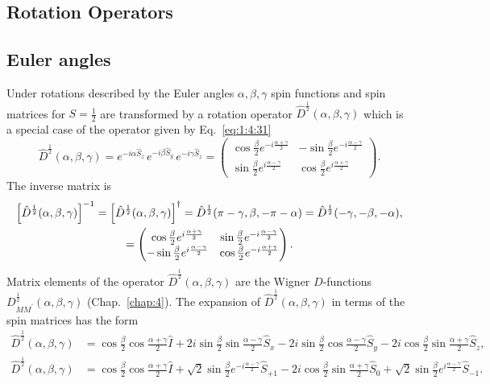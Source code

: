 \subsection{Rotation Operators}
\subsection{Euler angles}
 Under rotations described by the Euler angles $\alpha, \beta, \gamma$ spin functions and spin matrices for $S=\frac{1}{2}$ are transformed by a rotation operator $\widehat{D}^{\frac{1}{2}}(\alpha, \beta, \gamma)$ which is a special case of the operator given by Eq.~\eqref{eq:1:4:31}
\begin{equation}
\hat{D}^{\frac{1}{2}}(\alpha, \beta, \gamma)=e^{-i \alpha \hat{S}_{z}} \, e^{-i \beta \hat{S}_{y}} \, e^{-i \gamma \hat{S}_{z}}=\begin{pmatrix}
\cos \frac{\beta}{2} e^{-i \frac{\alpha+\gamma}{2}} & -\sin \frac{\beta}{2} e^{-i \frac{\alpha-\gamma}{2}}  \label{eq:2:5:32}\\
\sin \frac{\beta}{2} e^{i \frac{\alpha-\gamma}{2}} & \cos \frac{\beta}{2} e^{i \frac{\alpha+\gamma}{2}}
\end{pmatrix}.
\end{equation}
The inverse matrix is
\begin{gather}
{\left[\hat{D}^{\frac{1}{2}}(\alpha, \beta, \gamma)\right]^{-1}=\left[\hat{D}^{\frac{1}{2}}(\alpha, \beta, \gamma)\right]^{\dagger}=\hat{D}^{\frac{1}{2}}(\pi-\gamma, \beta,-\pi-\alpha)=\hat{D}^{\frac{1}{2}}(-\gamma,-\beta,-\alpha)} , \notag\\
=\begin{pmatrix}
\cos \frac{\beta}{2} e^{i \frac{\alpha+\gamma}{2}} & \sin \frac{\beta}{2} e^{-i \frac{\alpha-\gamma}{2}} \\
-\sin \frac{\beta}{2} e^{i \frac{\alpha-\gamma}{2}} & \cos \frac{\beta}{2} e^{-i \frac{\alpha+\gamma}{2}}
\end{pmatrix}. \label{eq:2:5:33}
\end{gather}
Matrix elements of the operator $\hat{D}^{\frac{1}{2}}(\alpha, \beta, \gamma)$ are the Wigner $D$-functions $D_{M M^{\prime}}^{\frac{1}{2}}(\alpha, \beta, \gamma)$ (Chap.~\ref{chap:4}). The expansion of $\widehat{D}^{\frac{1}{2}}(\alpha, \beta, \gamma)$ in terms of the spin matrices has the form
\begin{align}
\widehat{D}^{\frac{1}{2}}(\alpha, \beta, \gamma) & =\cos \frac{\beta}{2} \cos \frac{\alpha+\gamma}{2} \widehat{I}+2 i \sin \frac{\beta}{2} \sin \frac{\alpha-\gamma}{2} \widehat{S}_{x}-2 i \sin \frac{\beta}{2} \cos \frac{\alpha-\gamma}{2} \widehat{S}_{y}-2 i \cos \frac{\beta}{2} \sin \frac{\alpha+\gamma}{2} \widehat{S}_{z},  \label{eq:2:5:34}\\
\widehat{D}^{\frac{1}{2}}(\alpha, \beta, \gamma) & =\cos \frac{\beta}{2} \cos \frac{\alpha+\gamma}{2} \widehat{I}+\sqrt{2} \sin \frac{\beta}{2} e^{-i \frac{\alpha-\gamma}{2}} \widehat{S}_{+1}-2 i \cos \frac{\beta}{2} \sin \frac{\alpha+\gamma}{2} \widehat{S}_{0}+\sqrt{2} \sin \frac{\beta}{2} e^{i \frac{\alpha-\gamma}{2}} \widehat{S}_{-1} . \label{eq:2:5:35}
\end{align}
